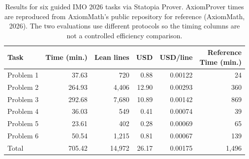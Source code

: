 \begin{table}[!htbp]
\centering
\caption{Results for six guided IMO 2026 tasks via Statopia Prover. AxiomProver times are reproduced from AxiomMath's public repository for reference (AxiomMath, 2026). The two evaluations use different protocols so the timing columns are not a controlled efficiency comparison.}
\label{tab:imo-results}
\small
\begin{tabular}{@{}lrrrrr@{}}
\toprule
Task & Time (min.) & Lean lines & USD & USD/line & \shortstack{Reference\\Time (min.)} \\
\midrule
Problem 1 & 37.63 & 720 & 0.88 & 0.00122 & 24 \\
Problem 2 & 264.93 & 4,406 & 12.90 & 0.00293 & 360 \\
Problem 3 & 292.68 & 7,680 & 10.89 & 0.00142 & 869 \\
Problem 4 & 36.03 & 549 & 0.41 & 0.00074 & 39 \\
Problem 5 & 23.61 & 402 & 0.28 & 0.00069 & 65 \\
Problem 6 & 50.54 & 1,215 & 0.81 & 0.00067 & 139 \\
\midrule
Total & 705.42 & 14,972 & 26.17 & 0.00175 & 1,496 \\
\bottomrule
\end{tabular}
\end{table}
